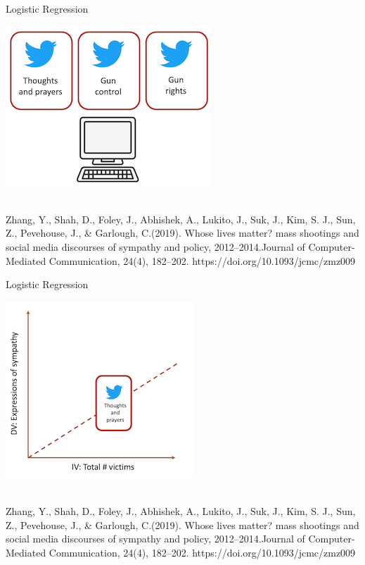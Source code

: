 \documentclass[compress]{beamer}
\begin{document}
\begin{frame}{Logistic Regression}
	
\begin{center}
	\includegraphics{../pictures/Zhangetal_2.png} \\\
\end{center}
\begin{tiny}
Zhang, Y., Shah, D., Foley, J., Abhishek, A., Lukito, J., Suk, J., Kim, S. J., Sun, Z., Pevehouse, J., \& Garlough, C.(2019). Whose lives matter? mass shootings and social media discourses of sympathy and policy, 2012–2014.Journal of Computer-Mediated Communication, 24(4), 182–202. https://doi.org/10.1093/jcmc/zmz009
\end{tiny}
		
\end{frame}


\begin{frame}{Logistic Regression}
	
\begin{center}
	\includegraphics{../pictures/Zhangetal_3.png} \\\
\end{center}
\begin{tiny}
Zhang, Y., Shah, D., Foley, J., Abhishek, A., Lukito, J., Suk, J., Kim, S. J., Sun, Z., Pevehouse, J., \& Garlough, C.(2019). Whose lives matter? mass shootings and social media discourses of sympathy and policy, 2012–2014.Journal of Computer-Mediated Communication, 24(4), 182–202. https://doi.org/10.1093/jcmc/zmz009
\end{tiny}	
\end{frame}
\end{document}
